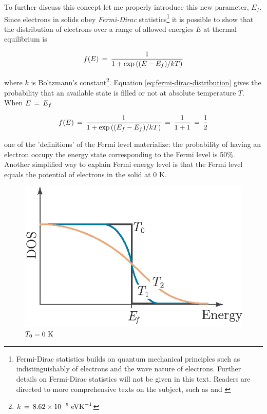 {To further discuss this concept let me properly introduce this new parameter, $E_f$. Since electrons in solids obey \textit{Fermi-Dirac} statistics\footnote{Fermi-Dirac statistics builds on quantum mechanical principles such as indistinguishably of electrons and the wave nature of electrons. Further details on Fermi-Dirac statistics will not be given in this text. Readers are directed to more comprehensive texts on the subject, such as \citet{Schroeder1999} and \citet{Kittel2004}}  it is possible to show that the distribution of electrons over a range of allowed energies $E$ at thermal equilibrium is

	\begin{align}
		f(E) \,=\, \dfrac{1}{1+\text{exp}\left( (E-E_f)/kT \right)}
		\label{eq:fermi-dirac-distribution}
	\end{align}

where $k$ is Boltzmann's constant\footnote{$k\,=\, 8.62\times10^{-5}\text{ eVK}^{-1}$}. Equation \ref{eq:fermi-dirac-distribution} gives the probability that an available state is filled or not at absolute temperature $T$. When $E\,=\, E_f$

	\begin{align*}
		f(E) \,=\, \dfrac{1}{1+\text{exp}\left( (E_f-E_f)/kT \right)} \,=\, \dfrac{1}{1+1} \,=\, \dfrac{1}{2}
	\end{align*}

one of the 'definitions' of the Fermi level materialize: the probability of having an electron occupy the energy state corresponding to the Fermi level is 50\%. \citep{Streetman2015} Another simplified way to explain Fermi energy level is that the Fermi level equals the potential of electrons in the solid at 0 K.


	\begin{figure}
		\centering
		\includegraphics[scale=1]{Figures/Fermi_DOS.eps}
		\caption{$T_0 =0\text{ K}$}
		\label{fig:fermi_DOS}
	\end{figure}

}
